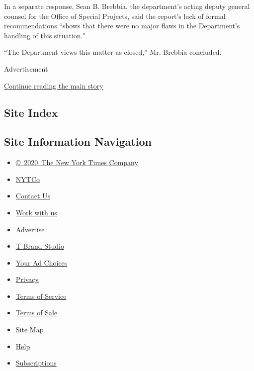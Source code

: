 In a separate response, Sean B. Brebbia, the department's acting deputy
general counsel for the Office of Special Projects, said the report's
lack of formal recommendations ``shows that there were no major flaws in
the Department's handling of this situation."

``The Department views this matter as closed,'' Mr. Brebbia concluded.

Advertisement

\protect\hyperlink{after-bottom}{Continue reading the main story}

\hypertarget{site-index}{%
\subsection{Site Index}\label{site-index}}

\hypertarget{site-information-navigation}{%
\subsection{Site Information
Navigation}\label{site-information-navigation}}

\begin{itemize}
\tightlist
\item
  \href{https://help.nytimes.com/hc/en-us/articles/115014792127-Copyright-notice}{©~2020~The
  New York Times Company}
\end{itemize}

\begin{itemize}
\tightlist
\item
  \href{https://www.nytco.com/}{NYTCo}
\item
  \href{https://help.nytimes.com/hc/en-us/articles/115015385887-Contact-Us}{Contact
  Us}
\item
  \href{https://www.nytco.com/careers/}{Work with us}
\item
  \href{https://nytmediakit.com/}{Advertise}
\item
  \href{http://www.tbrandstudio.com/}{T Brand Studio}
\item
  \href{https://www.nytimes.com/privacy/cookie-policy\#how-do-i-manage-trackers}{Your
  Ad Choices}
\item
  \href{https://www.nytimes.com/privacy}{Privacy}
\item
  \href{https://help.nytimes.com/hc/en-us/articles/115014893428-Terms-of-service}{Terms
  of Service}
\item
  \href{https://help.nytimes.com/hc/en-us/articles/115014893968-Terms-of-sale}{Terms
  of Sale}
\item
  \href{https://spiderbites.nytimes.com}{Site Map}
\item
  \href{https://help.nytimes.com/hc/en-us}{Help}
\item
  \href{https://www.nytimes.com/subscription?campaignId=37WXW}{Subscriptions}
\end{itemize}
